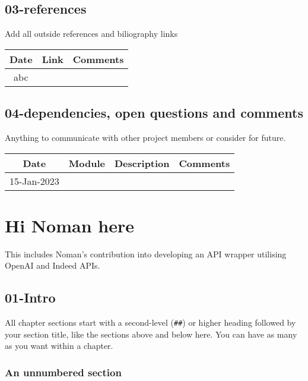 \documentclass[
]{book}
\begin{document}
\hypertarget{references-1}{%
\section{03-references}\label{references-1}}

Add all outside references and biliography links

\begin{longtable}[]{@{}cll@{}}
\toprule()
Date & Link & Comments \\
\midrule()
\endhead
abc & & \\
\bottomrule()
\end{longtable}

\hypertarget{dependencies-open-questions-and-comments-1}{%
\section{04-dependencies, open questions and comments}\label{dependencies-open-questions-and-comments-1}}

Anything to communicate with other project members or consider for future.

\begin{longtable}[]{@{}clll@{}}
\toprule()
Date & Module & Description & Comments \\
\midrule()
\endhead
15-Jan-2023 & & & \\
\bottomrule()
\end{longtable}

\hypertarget{hi-noman-here}{%
\chapter{Hi Noman here}\label{hi-noman-here}}

This includes Noman's contribution into developing an API wrapper utilising OpenAI and Indeed APIs.

\hypertarget{intro-2}{%
\section{01-Intro}\label{intro-2}}

All chapter sections start with a second-level (\texttt{\#\#}) or higher heading followed by your section title, like the sections above and below here. You can have as many as you want within a chapter.

\hypertarget{an-unnumbered-section-3}{%
\subsection*{An unnumbered section}\label{an-unnumbered-section-3}}
\end{document}
